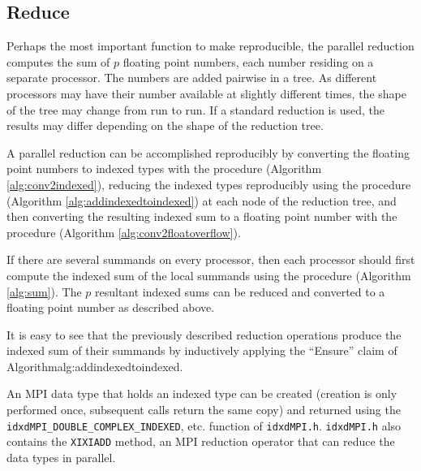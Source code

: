 \subsection{Reduce}
  \label{sec:compositeops_reduce}
  Perhaps the most important function to make reproducible, the parallel reduction computes the sum of $p$ floating point numbers, each number residing on a separate processor. The numbers are added pairwise in a tree. As different processors may have their number available at slightly different times, the shape of the tree may change from run to run. If a standard reduction is used, the results may differ depending on the shape of the reduction tree.

  A parallel reduction can be accomplished reproducibly by converting the floating point numbers to indexed types with the  procedure (Algorithm \ref{alg:conv2indexed}), reducing the indexed types reproducibly using the  procedure (Algorithm \ref{alg:addindexedtoindexed}) at each node of the reduction tree, and then converting the resulting indexed sum to a floating point number with the  procedure (Algorithm \ref{alg:conv2floatoverflow}). 

  If there are several summands on every processor, then each processor should first compute the indexed sum of the local summands using the  procedure (Algorithm \ref{alg:sum}). The $p$ resultant indexed sums can be reduced and converted to a floating point number as described above.

  It is easy to see that the previously described reduction operations produce the indexed sum of their summands by inductively applying the ``Ensure'' claim of Algorithm{alg:addindexedtoindexed}.

  An MPI data type that holds an indexed type can be created (creation is only performed once, subsequent calls return the same copy) and returned using the \texttt{idxdMPI\_DOUBLE\_COMPLEX\_INDEXED}, etc. function of \texttt{idxdMPI.h}. \texttt{idxdMPI.h} also contains the \texttt{XIXIADD} method, an MPI reduction operator that can reduce the data types in parallel.
